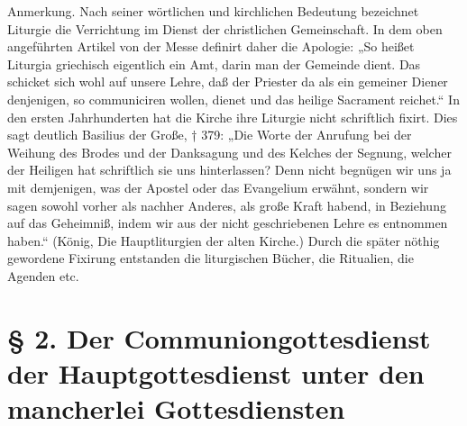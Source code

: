 Anmerkung. Nach seiner wörtlichen und kirchlichen Bedeutung bezeichnet Liturgie die Verrichtung im Dienst der christlichen Gemeinschaft. In dem
oben angeführten Artikel von der Messe definirt daher die Apologie: „So heißet Liturgia griechisch eigentlich ein Amt, darin man der Gemeinde dient. Das schicket sich wohl auf unsere Lehre, daß der Priester da als ein gemeiner Diener denjenigen, so communiciren wollen, dienet und das heilige Sacrament reichet.“ In den ersten Jahrhunderten hat die Kirche ihre Liturgie nicht schriftlich fixirt. Dies sagt deutlich Basilius der Große, † 379: „Die Worte der Anrufung bei der Weihung des Brodes und der Danksagung und des Kelches der Segnung, welcher der Heiligen hat schriftlich sie uns hinterlassen? Denn nicht begnügen wir uns ja mit demjenigen, was der Apostel oder das Evangelium erwähnt, sondern wir sagen sowohl vorher als nachher Anderes, als große Kraft habend, in Beziehung auf das Geheimniß, indem wir aus der nicht geschriebenen Lehre es entnommen haben.“ (König, Die Hauptliturgien der alten Kirche.) Durch die später nöthig gewordene Fixirung entstanden die liturgischen Bücher, die Ritualien, die Agenden etc.

\chapter[§ 2. Der Communiongottesdienst]{§ 2. Der Communiongottesdienst der Hauptgottesdienst unter den mancherlei Gottesdiensten}


